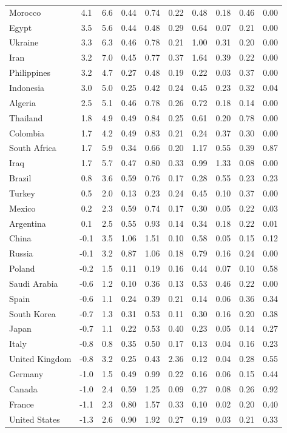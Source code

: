\begin{tabular}[t]{lccccccccc}
Morocco & 4.1 & 6.6 & 0.44 & 0.74 & 0.22 & 0.48 & 0.18 & 0.46 & 0.00\\
Egypt & 3.5 & 5.6 & 0.44 & 0.48 & 0.29 & 0.64 & 0.07 & 0.21 & 0.00\\
Ukraine & 3.3 & 6.3 & 0.46 & 0.78 & 0.21 & 1.00 & 0.31 & 0.20 & 0.00\\
Iran & 3.2 & 7.0 & 0.45 & 0.77 & 0.37 & 1.64 & 0.39 & 0.22 & 0.00\\
Philippines & 3.2 & 4.7 & 0.27 & 0.48 & 0.19 & 0.22 & 0.03 & 0.37 & 0.00\\
Indonesia & 3.0 & 5.0 & 0.25 & 0.42 & 0.24 & 0.45 & 0.23 & 0.32 & 0.04\\
Algeria & 2.5 & 5.1 & 0.46 & 0.78 & 0.26 & 0.72 & 0.18 & 0.14 & 0.00\\
Thailand & 1.8 & 4.9 & 0.49 & 0.84 & 0.25 & 0.61 & 0.20 & 0.78 & 0.00\\
Colombia & 1.7 & 4.2 & 0.49 & 0.83 & 0.21 & 0.24 & 0.37 & 0.30 & 0.00\\
South Africa & 1.7 & 5.9 & 0.34 & 0.66 & 0.20 & 1.17 & 0.55 & 0.39 & 0.87\\
Iraq & 1.7 & 5.7 & 0.47 & 0.80 & 0.33 & 0.99 & 1.33 & 0.08 & 0.00\\
Brazil & 0.8 & 3.6 & 0.59 & 0.76 & 0.17 & 0.28 & 0.55 & 0.23 & 0.23\\
Turkey & 0.5 & 2.0 & 0.13 & 0.23 & 0.24 & 0.45 & 0.10 & 0.37 & 0.00\\
Mexico & 0.2 & 2.3 & 0.59 & 0.74 & 0.17 & 0.30 & 0.05 & 0.22 & 0.03\\
Argentina & 0.1 & 2.5 & 0.55 & 0.93 & 0.14 & 0.34 & 0.18 & 0.22 & 0.01\\
China & -0.1 & 3.5 & 1.06 & 1.51 & 0.10 & 0.58 & 0.05 & 0.15 & 0.12\\
Russia & -0.1 & 3.2 & 0.87 & 1.06 & 0.18 & 0.79 & 0.16 & 0.24 & 0.00\\
Poland & -0.2 & 1.5 & 0.11 & 0.19 & 0.16 & 0.44 & 0.07 & 0.10 & 0.58\\
Saudi Arabia & -0.6 & 1.2 & 0.10 & 0.36 & 0.13 & 0.53 & 0.46 & 0.22 & 0.00\\
Spain & -0.6 & 1.1 & 0.24 & 0.39 & 0.21 & 0.14 & 0.06 & 0.36 & 0.34\\
South Korea & -0.7 & 1.3 & 0.31 & 0.53 & 0.11 & 0.30 & 0.16 & 0.20 & 0.38\\
Japan & -0.7 & 1.1 & 0.22 & 0.53 & 0.40 & 0.23 & 0.05 & 0.14 & 0.27\\
Italy & -0.8 & 0.8 & 0.35 & 0.50 & 0.17 & 0.13 & 0.04 & 0.16 & 0.23\\
United Kingdom & -0.8 & 3.2 & 0.25 & 0.43 & 2.36 & 0.12 & 0.04 & 0.28 & 0.55\\
Germany & -1.0 & 1.5 & 0.49 & 0.99 & 0.22 & 0.16 & 0.06 & 0.15 & 0.44\\
Canada & -1.0 & 2.4 & 0.59 & 1.25 & 0.09 & 0.27 & 0.08 & 0.26 & 0.92\\
France & -1.1 & 2.3 & 0.80 & 1.57 & 0.33 & 0.10 & 0.02 & 0.20 & 0.40\\
United States & -1.3 & 2.6 & 0.90 & 1.92 & 0.27 & 0.19 & 0.03 & 0.21 & 0.33\\
\bottomrule
\end{tabular}